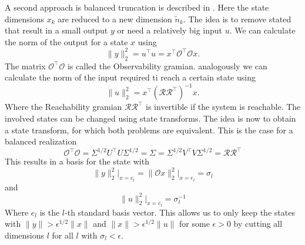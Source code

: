 \documentclass[doctype=mastersthesis,BCOR=15mm,biblatex]{ldvbook}%
\newcommand{\R}{\mathcal{R}} %
\newcommand{\Ob}{\mathcal{O}} %
\begin{document}
A second approach is balanced truncation is described in . 
Here the state dimensions $x_k$ are reduced to a new dimension $\tilde{n}_k$.
The idea is to remove stated that result in a small output $y$ or need a relatively big input $u$.
We can calculate the norm of the output for a state $x$ using
\begin{equation}
	\|y\|_2^2 = u^\top u = x^\top \Ob^\top \Ob x
	.
\end{equation}
The matrix $\Ob^\top \Ob$ is called the Observability gramian.
analogously we can calculate the norm of the input required ti reach a certain state using
\begin{equation}
	\|u\|_2^2 = x^\top (\R\R^\top)^{-1} x
	.
\end{equation}
Where the Reachability gramian $\R\R^\top$ is invertible if the system is reachable.
The involved states can be changed using state transforms.
The idea is now to obtain a state transform, for which both problems are equivalent. 
This is the case for a balanced realization
\begin{equation}
	\Ob^\top \Ob = \Sigma^{1/2}U^\top U\Sigma^{1/2} = \Sigma = \Sigma^{1/2} V^\top V \Sigma^{1/2} = \R \R^\top 
\end{equation}
This results in a basis for the state with 
\begin{equation}
	\|y\|_2^2\big|_{x = e_l} = \|\Ob x\|_2^2\big|_{x = e_l} = \sigma_l
\end{equation}
and 
\begin{equation}
\|u\|_2^2\big|_{x = e_l} = \sigma_l^{-1}
\end{equation}
Where $e_l$ is the $l$-th standard basis vector.
This allows us to only keep the states with $\|y\| > \epsilon^{1/2} \|x\|$ and $\|x\| > \epsilon^{1/2} \|u\| $ for some $\epsilon>0$ by cutting all dimensions $l$ for all $l$ with $\sigma_l < \epsilon$.
\end{document}
